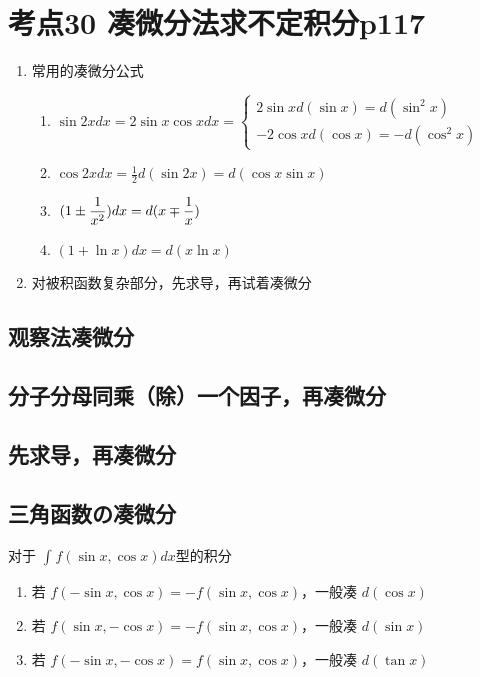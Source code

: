 \section{考点30 凑微分法求不定积分p117}

\begin{enumerate}
    \item 常用的凑微分公式
        \begin{enumerate}
        \item $\sin 2xdx=2\sin x\cos xdx=\left\{
            \begin{array}{cl}
                2\sin xd(\sin x)=d(\sin^2 x)\\
                -2\cos x d(\cos x)=-d(\cos^2 x)
            \end{array}\right.$
        \item $\cos 2xdx=\frac{1}{2}d(\sin 2x)=d(\cos x\sin x)$
        \item $\displaystyle\hspace{.2em}(1\pm \frac{1}{x^2})dx=d(x\mp \frac{1}{x})$
        \item $(1+\ln x)dx=d(x\ln x)$
    \end{enumerate}
    \item 对被积函数复杂部分，先求导，再试着凑微分
\end{enumerate}

\subsection{观察法凑微分}

\subsection{分子分母同乘（除）一个因子，再凑微分}

\subsection{先求导，再凑微分}

\subsection{三角函数の凑微分}

\begin{tcolorbox}
    
    对于 $\int_{}^{}f(\sin x,\cos x)dx$型的积分
    
    \begin{enumerate}
        \item 若 $f(-\sin x,\cos x)=-f(\sin x,\cos x)$，一般凑 $d(\cos x)$
        \item 若 $f(\sin x,-\cos x)=-f(\sin x,\cos x)$，一般凑 $d(\sin x)$
        \item 若 $f(-\sin x,-\cos x)=f(\sin x,\cos x)$，一般凑 $d(\tan x)$
    \end{enumerate}
\end{tcolorbox}
    
